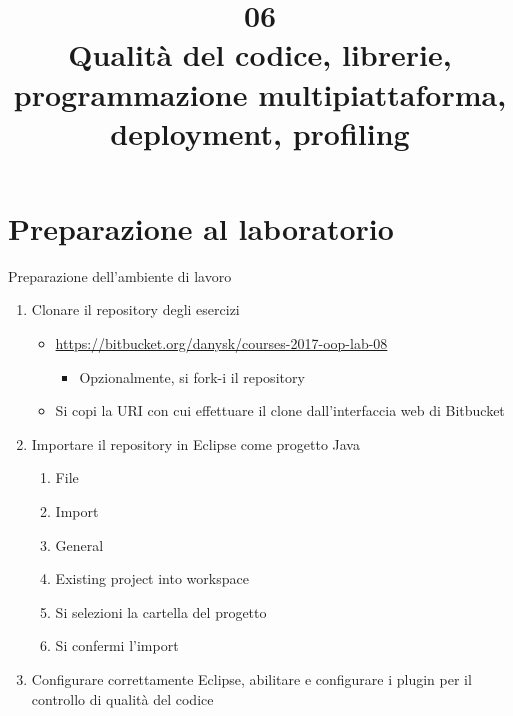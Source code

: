 \documentclass[presentation]{beamer}
\title[Code quality]{06\\ Qualità del codice, librerie, programmazione multipiattaforma, deployment, profiling}
\begin{document}
\frame[label=coverpage]{\titlepage}

\section{Preparazione al laboratorio}

\begin{frame}{Preparazione dell'ambiente di lavoro}
	\begin{enumerate}
		\item Clonare il repository degli esercizi
		\begin{itemize}
			\item \url{https://bitbucket.org/danysk/courses-2017-oop-lab-08}
			\begin{itemize}
				\item Opzionalmente, si fork-i il repository
			\end{itemize}
			\item Si copi la URI con cui effettuare il clone dall'interfaccia web di Bitbucket
		\end{itemize}
		\item Importare il repository in Eclipse come progetto Java
		\begin{enumerate}
			\item File
			\item Import
			\item General
			\item Existing project into workspace
			\item Si selezioni la cartella del progetto
			\item Si confermi l'import
		\end{enumerate}
		\item \alert{Configurare correttamente Eclipse, abilitare e configurare i plugin per il controllo di qualità del codice}
	\end{enumerate}
\end{frame}
\end{document}
